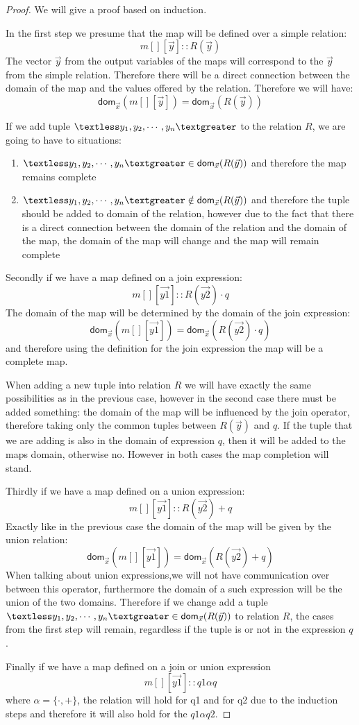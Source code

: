 \documentclass[12pt]{article}
\newcommand{\dom}{\textsf{dom}}
\begin{document}
\begin{proof}
We will give a proof based on induction.

In the first step we presume that the map will be defined over a simple relation: $$m[][\vec{y}]::R(\vec{y})$$ The vector $\vec{y}$ from the output variables of the maps will correspond to the $\vec{y}$ from the simple relation. Therefore there will be a direct connection between the domain of the map and the values offered by the relation. Therefore we will have: 
$$\dom{}_{\vec{x}}(m[][\vec{y}])=\dom{}_{\vec{x}}(R(\vec{y}))$$ 

If we add tuple $\textless y_1,y_2,\cdots,y_n\textgreater$ to the relation $R$, we are going to have to situations:
\begin{enumerate}
\item $\textless y_1,y_2,\cdots,y_n\textgreater\in\dom{}_{\vec{x}}(R(\vec{y}))$ and therefore the map remains complete
\item $\textless y_1,y_2,\cdots,y_n\textgreater\notin\dom{}_{\vec{x}}(R(\vec{y}))$ and therefore the tuple should be added to domain of the relation, however due to the fact that there is a direct connection between the domain of the relation and the domain of the map, the domain of the map will change and the map will remain complete
\end{enumerate}

Secondly if we have a map defined on a join expression: $$m[][\vec{y1}]::R(\vec{y2})\cdot q$$ The domain of the map will be determined by the domain of the join expression: $$\dom{}_{\vec{x}}(m[][\vec{y1}])=\dom{}_{\vec{x}}(R(\vec{y2})\cdot q)$$ and therefore using the definition for the join expression the map will be a complete map. 

When adding a new tuple into relation $R$ we will have exactly the same possibilities as in the previous case, however in the second case there must be added something: the domain of the map will be influenced by the join operator, therefore taking only the common tuples between $R(\vec{y})$ and $q$. If the tuple that we are adding is also in the domain of expression $q$, then it will be added to the maps domain, otherwise no. However in both cases the map completion will stand.

Thirdly if we have a map defined on a union expression: $$m[][\vec{y1}]::R(\vec{y2})+ q$$ Exactly like in the previous case the domain of the map will be given by the union relation: $$\dom{}_{\vec{x}}(m[][\vec{y1}])=\dom{}_{\vec{x}}(R(\vec{y2})+ q)$$ When talking about union expressions,we will not have communication over between this operator, furthermore the domain of a such expression will be the union of the two domains. Therefore if we change add a tuple $\textless y_1,y_2,\cdots,y_n\textgreater\in\dom{}_{\vec{x}}(R(\vec{y}))$ to relation $R$, the cases from the first step will remain, regardless if the tuple is or not in the expression $q$. 

Finally if we have a map defined on a join or union expression $$m[][\vec{y1}]::q1\alpha q$$ where $\alpha=\{\cdot,+\}$, the relation will hold for q1 and for q2 due to the induction steps and  therefore it will also hold for the $q1\alpha q2$.
\end{proof}
\end{document}
